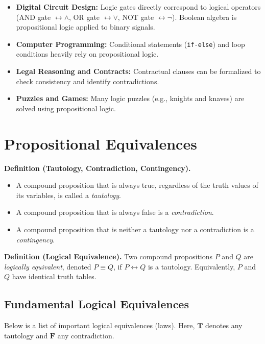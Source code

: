 \documentclass[11pt,a4paper]{article}
\begin{document}
\begin{itemize}
    \item \textbf{Digital Circuit Design:} Logic gates directly correspond to logical operators (AND gate $\leftrightarrow \land$, OR gate $\leftrightarrow \lor$, NOT gate $\leftrightarrow \neg$). Boolean algebra is propositional logic applied to binary signals.
    \item \textbf{Computer Programming:} Conditional statements (\texttt{if-else}) and loop conditions heavily rely on propositional logic.
    \item \textbf{Legal Reasoning and Contracts:} Contractual clauses can be formalized to check consistency and identify contradictions.
    \item \textbf{Puzzles and Games:} Many logic puzzles (e.g., knights and knaves) are solved using propositional logic.
\end{itemize}

\section{Propositional Equivalences}

\textbf{Definition (Tautology, Contradiction, Contingency).}
\begin{itemize}
    \item A compound proposition that is always true, regardless of the truth values of its variables, is called a \textit{tautology}.
    \item A compound proposition that is always false is a \textit{contradiction}.
    \item A compound proposition that is neither a tautology nor a contradiction is a \textit{contingency}.
\end{itemize}

\textbf{Definition (Logical Equivalence).} Two compound propositions $P$ and $Q$ are \textit{logically equivalent}, denoted $P \equiv Q$, if $P \leftrightarrow Q$ is a tautology. Equivalently, $P$ and $Q$ have identical truth tables.

\subsection{Fundamental Logical Equivalences}

Below is a list of important logical equivalences (laws). Here, $\mathbf{T}$ denotes any tautology and $\mathbf{F}$ any contradiction.
\end{document}
